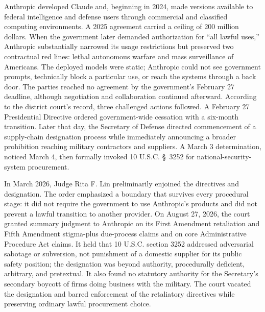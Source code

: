 Anthropic developed Claude and, beginning in 2024, made versions available to federal intelligence and defense users through commercial and classified computing environments. A 2025 agreement carried a ceiling of 200 million dollars. When the government later demanded authorization for ``all lawful uses,'' Anthropic substantially narrowed its usage restrictions but preserved two contractual red lines: lethal autonomous warfare and mass surveillance of Americans. The deployed models were static; Anthropic could not see government prompts, technically block a particular use, or reach the systems through a back door. The parties reached no agreement by the government's February 27 deadline, although negotiation and collaboration continued afterward. According to the district court's record, three challenged actions followed. A February 27 Presidential Directive ordered government-wide cessation with a six-month transition. Later that day, the Secretary of Defense directed commencement of a supply-chain designation process while immediately announcing a broader prohibition reaching military contractors and suppliers. A March 3 determination, noticed March 4, then formally invoked 10 U.S.C. \S~3252 for national-security-system procurement.

In March 2026, Judge Rita F. Lin preliminarily enjoined the directives and designation. The order emphasized a boundary that survives every procedural stage: it did not require the government to use Anthropic's products and did not prevent a lawful transition to another provider. On August 27, 2026, the court granted summary judgment to Anthropic on its First Amendment retaliation and Fifth Amendment stigma-plus due-process claims and on core Administrative Procedure Act claims. It held that 10 U.S.C. section 3252 addressed adversarial sabotage or subversion, not punishment of a domestic supplier for its public safety position; the designation was beyond authority, procedurally deficient, arbitrary, and pretextual. It also found no statutory authority for the Secretary's secondary boycott of firms doing business with the military. The court vacated the designation and barred enforcement of the retaliatory directives while preserving ordinary lawful procurement choice.

